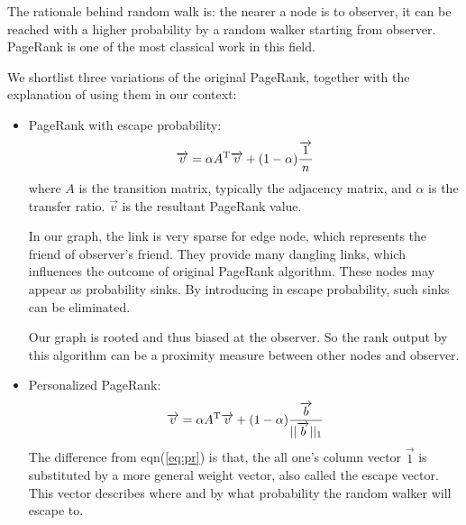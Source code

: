 \documentclass[11pt,a4paper]{article}
\begin{document}
The rationale behind random walk is: the nearer a node
is to observer, it can be reached with a higher probability by a random 
	walker starting from observer. PageRank is one of the most classical work 
	in this field.

We shortlist three variations\cite{aggarwal2011social} of the original 
PageRank, together with the explanation of using them in our context:
		\begin{itemize}
			\item PageRank with escape probability:
			\begin{equation}
				\overrightarrow{v} = \alpha A^{\rm T}\overrightarrow{v}
				+ (1-\alpha)\frac{\overrightarrow{1}}{n}
				\label{eq:pr}
			\end{equation}
			where $A$ is the transition matrix, typically the adjacency matrix,
			and $\alpha$ is the transfer ratio. $ \overrightarrow{v} $ is 
			the resultant PageRank value. 
			
			In our graph, the link is very sparse for edge node, which 
			represents the friend of observer's friend. They provide 
			many dangling links, which influences the outcome of 
			original PageRank algorithm. These nodes may appear as probability
			sinks. By introducing in escape probability, such sinks can be eliminated. 
			
			Our graph is rooted and thus biased at the observer. So the
			rank output by this algorithm can be a proximity 
			measure between other nodes and observer. 
			
			\item Personalized PageRank:
			\begin{equation}
				\overrightarrow{v} = \alpha A^{\rm T}\overrightarrow{v}
				+ (1-\alpha)\frac{\overrightarrow{b}}{||\overrightarrow{b}||_1}
				\label{eq:ppr}
			\end{equation}
			The difference from eqn(\ref{eq:pr}) is that, the all one's column vector 
			$\overrightarrow{1}$ is 
			substituted by a more general weight vector, also called the 
			escape vector. This vector describes where and by what probability 
			the random walker will escape to. 		
			

\end{itemize}
\end{document}
